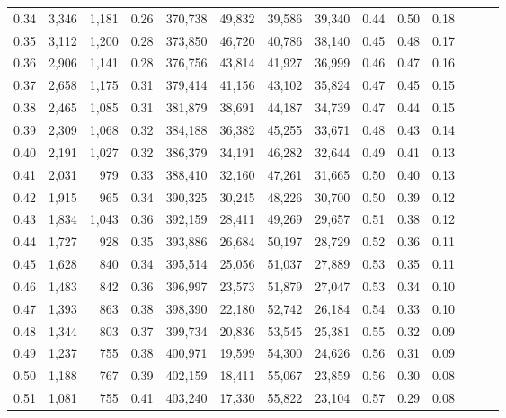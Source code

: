 \begin{tabular}{rrrrrrrrrrrrrr}
0.34 &   3,346 &  1,181 &  0.26 &  370,738 &   49,832 &  39,586 &  39,340 &  0.44 &  0.50 &      0.18 \\
0.35 &   3,112 &  1,200 &  0.28 &  373,850 &   46,720 &  40,786 &  38,140 &  0.45 &  0.48 &      0.17 \\
0.36 &   2,906 &  1,141 &  0.28 &  376,756 &   43,814 &  41,927 &  36,999 &  0.46 &  0.47 &      0.16 \\
0.37 &   2,658 &  1,175 &  0.31 &  379,414 &   41,156 &  43,102 &  35,824 &  0.47 &  0.45 &      0.15 \\
0.38 &   2,465 &  1,085 &  0.31 &  381,879 &   38,691 &  44,187 &  34,739 &  0.47 &  0.44 &      0.15 \\
0.39 &   2,309 &  1,068 &  0.32 &  384,188 &   36,382 &  45,255 &  33,671 &  0.48 &  0.43 &      0.14 \\
0.40 &   2,191 &  1,027 &  0.32 &  386,379 &   34,191 &  46,282 &  32,644 &  0.49 &  0.41 &      0.13 \\
0.41 &   2,031 &    979 &  0.33 &  388,410 &   32,160 &  47,261 &  31,665 &  0.50 &  0.40 &      0.13 \\
0.42 &   1,915 &    965 &  0.34 &  390,325 &   30,245 &  48,226 &  30,700 &  0.50 &  0.39 &      0.12 \\
0.43 &   1,834 &  1,043 &  0.36 &  392,159 &   28,411 &  49,269 &  29,657 &  0.51 &  0.38 &      0.12 \\
0.44 &   1,727 &    928 &  0.35 &  393,886 &   26,684 &  50,197 &  28,729 &  0.52 &  0.36 &      0.11 \\
0.45 &   1,628 &    840 &  0.34 &  395,514 &   25,056 &  51,037 &  27,889 &  0.53 &  0.35 &      0.11 \\
0.46 &   1,483 &    842 &  0.36 &  396,997 &   23,573 &  51,879 &  27,047 &  0.53 &  0.34 &      0.10 \\
0.47 &   1,393 &    863 &  0.38 &  398,390 &   22,180 &  52,742 &  26,184 &  0.54 &  0.33 &      0.10 \\
0.48 &   1,344 &    803 &  0.37 &  399,734 &   20,836 &  53,545 &  25,381 &  0.55 &  0.32 &      0.09 \\
0.49 &   1,237 &    755 &  0.38 &  400,971 &   19,599 &  54,300 &  24,626 &  0.56 &  0.31 &      0.09 \\
0.50 &   1,188 &    767 &  0.39 &  402,159 &   18,411 &  55,067 &  23,859 &  0.56 &  0.30 &      0.08 \\
0.51 &   1,081 &    755 &  0.41 &  403,240 &   17,330 &  55,822 &  23,104 &  0.57 &  0.29 &      0.08 \\

\end{tabular}
